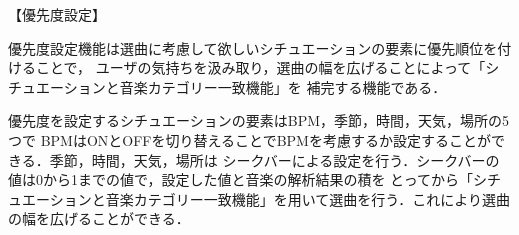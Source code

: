 【優先度設定】
\par
 優先度設定機能は選曲に考慮して欲しいシチュエーションの要素に優先順位を付けることで，
 ユーザの気持ちを汲み取り，選曲の幅を広げることによって「シチュエーションと音楽カテゴリー一致機能」を
 補完する機能である．
 
\par 
 優先度を設定するシチュエーションの要素はBPM，季節，時間，天気，場所の5つで
 BPMはONとOFFを切り替えることでBPMを考慮するか設定することができる．季節，時間，天気，場所は
 シークバーによる設定を行う．シークバーの値は0から1までの値で，設定した値と音楽の解析結果の積を
 とってから「シチュエーションと音楽カテゴリー一致機能」を用いて選曲を行う．これにより選曲の幅を広げることができる．
 
